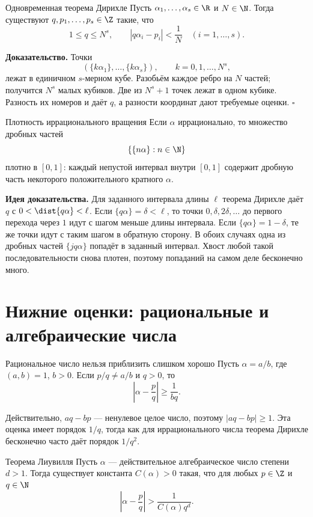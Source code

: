 \begin{theorembox}{Одновременная теорема Дирихле}
Пусть $\alpha_1,\ldots,\alpha_s\in\R$ и $N\in\N$. Тогда существуют
$q,p_1,\ldots,p_s\in\Z$ такие, что
\[
  1\le q\le N^s,
  \qquad
  |q\alpha_i-p_i|<\frac1N
  \quad (i=1,\ldots,s).
\]
\end{theorembox}

\textbf{Доказательство.}
Точки
\[
  (\{k\alpha_1\},\ldots,\{k\alpha_s\}),
  \qquad k=0,1,\ldots,N^s,
\]
лежат в единичном $s$-мерном кубе. Разобьём каждое ребро на $N$
частей; получится $N^s$ малых кубиков. Две из $N^s+1$ точек лежат
в одном кубике. Разность их номеров и даёт $q$, а разности координат
дают требуемые оценки. \hfill$\square$

\begin{theorembox}{Плотность иррационального вращения}
Если $\alpha$ иррационально, то множество дробных частей
\[
  \{\{n\alpha\}:n\in\N\}
\]
плотно в $[0,1]$: каждый непустой интервал внутри $[0,1]$ содержит
дробную часть некоторого положительного кратного $\alpha$.
\end{theorembox}

\textbf{Идея доказательства.}
Для заданного интервала длины $\ell$ теорема Дирихле даёт $q$ с
$0<\dist{q\alpha}<\ell$. Если $\{q\alpha\}=\delta<\ell$, то точки
$0,\delta,2\delta,\ldots$ до первого перехода через $1$ идут с шагом
меньше длины интервала. Если $\{q\alpha\}=1-\delta$, те же точки идут
с таким шагом в обратную сторону. В обоих случаях одна из дробных
частей $\{jq\alpha\}$ попадёт в заданный интервал. Хвост любой такой
последовательности снова плотен, поэтому попаданий на самом деле
бесконечно много.

\section{Нижние оценки: рациональные и алгебраические числа}

\begin{theorembox}{Рациональное число нельзя приблизить слишком хорошо}
Пусть $\alpha=a/b$, где $(a,b)=1$, $b>0$. Если $p/q\ne a/b$ и
$q>0$, то
\[
  \left|\alpha-\frac pq\right|\ge\frac1{bq}.
\]
\end{theorembox}

Действительно, $aq-bp$ --- ненулевое целое число, поэтому
$|aq-bp|\ge1$. Эта оценка имеет порядок $1/q$, тогда как для
иррационального числа теорема Дирихле бесконечно часто даёт порядок
$1/q^2$.

\begin{theorembox}{Теорема Лиувилля}
Пусть $\alpha$ --- действительное алгебраическое число степени
$d>1$. Тогда существует константа $C(\alpha)>0$ такая, что для любых
$p\in\Z$ и $q\in\N$
\[
  \left|\alpha-\frac pq\right|>
  \frac1{C(\alpha)q^d}.
\]
\end{theorembox}

